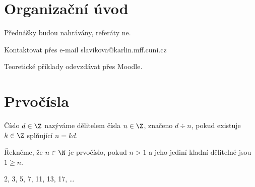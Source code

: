 \documentclass[12pt]{article}					%
\begin{document}
\section*{Organizační úvod}
   Přednášky budou nahrávány, referáty ne.

   Kontaktovat přes e-mail slavikova@karlin.mff.cuni.cz

   Teoretické příklady odevzdávat přes Moodle.

\section{Prvočísla}
    \begin{definice}[Dělitel]
        Číslo $d \in \Z$ nazýváme dělitelem čísla $n \in \Z$, značeno $d\div n$, pokud existuje $k \in \Z$ splňující $n = kd$.
    \end{definice}
    
    \begin{definice}[Prvočíslo]
        Řekněme, že $n \in \N$ je prvočíslo, pokud $n>1$ a jeho jediní kladní dělitelné jsou $1≥n$.
        \begin{prikladyin}
            2, 3, 5, 7, 11, 13, 17, …
        \end{prikladyin}
    \end{definice}
\end{document}

